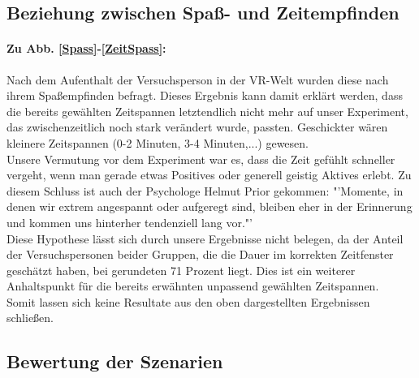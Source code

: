 \documentclass{Paper}
\begin{document}
\subsection{Beziehung zwischen Spaß- und Zeitempfinden}
\paragraph{Zu Abb. \ref{Spass}-\ref{ZeitSpass}:} Nach dem Aufenthalt der Versuchsperson in der VR-Welt wurden diese nach ihrem Spaßempfinden befragt. Dieses Ergebnis kann damit erklärt werden, dass die bereits gewählten Zeitspannen letztendlich nicht mehr auf unser Experiment, das zwischenzeitlich noch stark verändert wurde, passten. Geschickter wären kleinere Zeitspannen (0-2 Minuten, 3-4 Minuten,...) gewesen.\\
Unsere Vermutung vor dem Experiment war es, dass die Zeit gefühlt schneller vergeht, wenn man gerade etwas Positives oder generell geistig Aktives erlebt. Zu diesem Schluss ist auch der Psychologe Helmut Prior gekommen: "'Momente, in denen wir extrem angespannt oder aufgeregt sind, bleiben eher in der Erinnerung und kommen uns hinterher tendenziell lang vor."' \cite{Irle2017} \\
Diese Hypothese lässt sich durch unsere Ergebnisse nicht belegen, da der Anteil der Versuchspersonen beider Gruppen, die die Dauer im korrekten Zeitfenster geschätzt haben, bei gerundeten 71 Prozent liegt. Dies ist ein weiterer Anhaltspunkt für die bereits erwähnten unpassend gewählten Zeitspannen.\\
Somit lassen sich keine Resultate aus den oben dargestellten Ergebnissen schließen.

\subsection{Bewertung der Szenarien}
\end{document}
